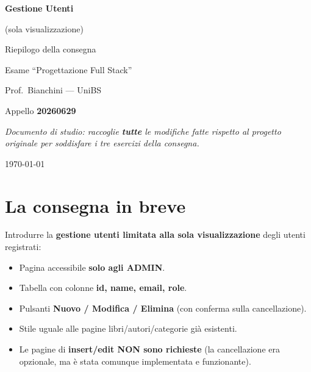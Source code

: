 \documentclass[11pt,a4paper]{article}
\begin{document}
\begin{titlepage}
\centering
\vspace*{2cm}
{\Huge\bfseries\color{accent} Gestione Utenti\par}
\vspace{0.4cm}
{\Large (sola visualizzazione)\par}
\vspace{1.5cm}
{\large Riepilogo della consegna\par}
\vspace{0.6cm}
{\large Esame ``Progettazione Full Stack''\par}
{\large Prof.\ Bianchini --- UniBS\par}
\vspace{0.4cm}
{\large Appello \textbf{20260629}\par}
\vfill
\begin{minipage}{0.85\textwidth}
\small\itshape
Documento di studio: raccoglie \textbf{tutte} le modifiche fatte rispetto al
progetto originale per soddisfare i tre esercizi della consegna.
\end{minipage}
\vfill
{\large \today\par}
\end{titlepage}

\sloppy

\tableofcontents
\newpage

\section{La consegna in breve}

Introdurre la \textbf{gestione utenti limitata alla sola visualizzazione}
degli utenti registrati:

\begin{itemize}[leftmargin=1.4em]
  \item Pagina accessibile \textbf{solo agli ADMIN}.
  \item Tabella con colonne \textbf{id, name, email, role}.
  \item Pulsanti \textbf{Nuovo / Modifica / Elimina} (con conferma sulla cancellazione).
  \item Stile uguale alle pagine libri/autori/categorie già esistenti.
  \item Le pagine di \textbf{insert/edit NON sono richieste} (la cancellazione era
        opzionale, ma è stata comunque implementata e funzionante).
\end{itemize}
\end{document}
